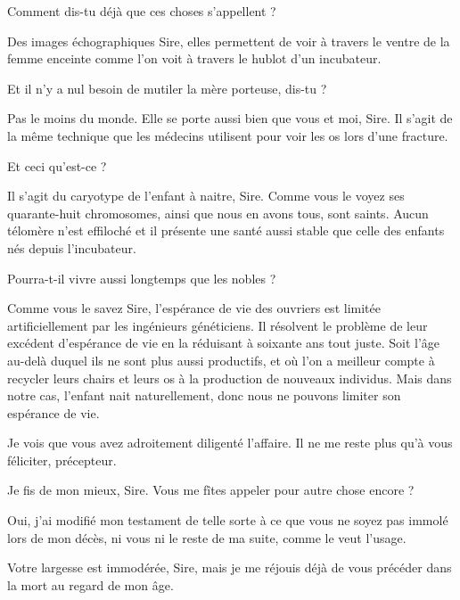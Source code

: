 \scene

\StageDirII{\elena, \alexas}

\begin{drama}
  \elenaspeaks {} Comment dis-tu déjà que ces choses s’appellent ?

  \alexasspeaks Des images échographiques Sire, elles permettent de voir à travers le ventre de la femme enceinte comme l’on voit à travers le hublot d’un incubateur.

  \elenaspeaks Et il n’y a nul besoin de mutiler la mère porteuse, dis-tu ?

  \alexasspeaks Pas le moins du monde. Elle se porte aussi bien que vous et moi, Sire. Il s’agit de la même technique que les médecins utilisent pour voir les os lors d’une fracture.

  \elenaspeaks Et ceci qu’est-ce ?

  \alexasspeaks Il s’agit du caryotype de l’enfant à naitre, Sire. Comme vous le voyez ses quarante-huit chromosomes, ainsi que nous en avons tous, sont saints. Aucun télomère n’est effiloché et il présente une santé aussi stable que celle des enfants nés depuis l’incubateur. 

  \elenaspeaks Pourra-t-il vivre aussi longtemps que les nobles ?

  \alexasspeaks Comme vous le savez Sire, l’espérance de vie des ouvriers  est limitée artificiellement par les ingénieurs généticiens. Il résolvent le problème de leur excédent d’espérance de vie en la réduisant à soixante ans tout juste. Soit l’âge au-delà duquel ils ne sont plus aussi productifs, et où l’on a meilleur compte à recycler leurs chairs et leurs os à la production de nouveaux individus. Mais dans notre cas, l’enfant nait naturellement, donc nous ne pouvons limiter son espérance de vie.

  \elenaspeaks Je vois que vous avez adroitement diligenté l’affaire. Il ne me reste plus qu’à vous féliciter, précepteur.

  \alexasspeaks Je fis de mon mieux, Sire. Vous me fîtes appeler pour autre chose encore ?

  \elenaspeaks Oui, j’ai modifié mon testament de telle sorte à ce que vous ne soyez pas immolé lors de mon décès, ni vous ni le reste de ma suite, comme le veut l’usage.

  \alexasspeaks Votre largesse est immodérée, Sire, mais je me réjouis déjà de vous précéder dans la mort au regard de mon âge.


\end{drama}
